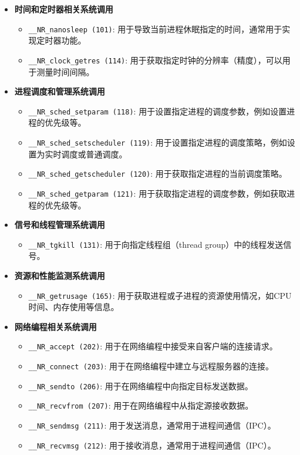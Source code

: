 \begin{itemize}
    \item \textbf{时间和定时器相关系统调用}
    \begin{itemize}
        \item \texttt{\_\_NR\_nanosleep (101)}: 用于导致当前进程休眠指定的时间，通常用于实现定时器功能。
        \item \texttt{\_\_NR\_clock\_getres (114)}: 用于获取指定时钟的分辨率（精度），可以用于测量时间间隔。
    \end{itemize}

    \item \textbf{进程调度和管理系统调用}
    \begin{itemize}
        \item \texttt{\_\_NR\_sched\_setparam (118)}: 用于设置指定进程的调度参数，例如设置进程的优先级等。
        \item \texttt{\_\_NR\_sched\_setscheduler (119)}: 用于设置指定进程的调度策略，例如设置为实时调度或普通调度。
        \item \texttt{\_\_NR\_sched\_getscheduler (120)}: 用于获取指定进程的当前调度策略。
        \item \texttt{\_\_NR\_sched\_getparam (121)}: 用于获取指定进程的调度参数，例如获取进程的优先级等。
    \end{itemize}

    \item \textbf{信号和线程管理系统调用}
    \begin{itemize}
        \item \texttt{\_\_NR\_tgkill (131)}: 用于向指定线程组（thread group）中的线程发送信号。
    \end{itemize}

    \item \textbf{资源和性能监测系统调用}
    \begin{itemize}
        \item \texttt{\_\_NR\_getrusage (165)}: 用于获取进程或子进程的资源使用情况，如CPU时间、内存使用等信息。
    \end{itemize}

    \item \textbf{网络编程相关系统调用}
    \begin{itemize}
        \item \texttt{\_\_NR\_accept (202)}: 用于在网络编程中接受来自客户端的连接请求。
        \item \texttt{\_\_NR\_connect (203)}: 用于在网络编程中建立与远程服务器的连接。
        \item \texttt{\_\_NR\_sendto (206)}: 用于在网络编程中向指定目标发送数据。
        \item \texttt{\_\_NR\_recvfrom (207)}: 用于在网络编程中从指定源接收数据。
        \item \texttt{\_\_NR\_sendmsg (211)}: 用于发送消息，通常用于进程间通信（IPC）。
        \item \texttt{\_\_NR\_recvmsg (212)}: 用于接收消息，通常用于进程间通信（IPC）。
    \end{itemize}


\end{itemize}
